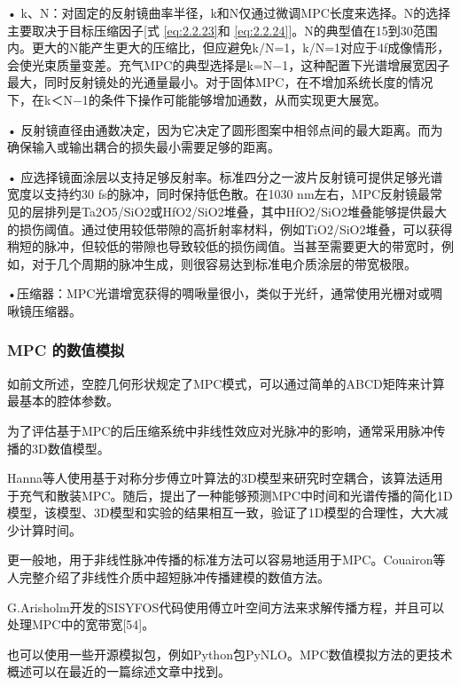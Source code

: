 \documentclass[14pt,a4paper,oneside]{article}
\numberwithin{equation}{subsection}             %
\numberwithin{figure}{subsection}               %
\begin{document}
• k、N：对固定的反射镜曲率半径，k和N仅通过微调MPC长度来选择。N的选择主要取决于目标压缩因子[式 \ref{eq:2.2.23}和 \ref{eq:2.2.24}]。N的典型值在15到30范围内。更大的N能产生更大的压缩比，但应避免k/N=1，k/N=1对应于4f成像情形，会使光束质量变差。充气MPC的典型选择是k=N−1，这种配置下光谱增展宽因子最大，同时反射镜处的光通量最小。对于固体MPC，在不增加系统长度的情况下，在k＜N−1的条件下操作可能能够增加通数，从而实现更大展宽。

• 反射镜直径由通数决定，因为它决定了圆形图案中相邻点间的最大距离。而为确保输入或输出耦合的损失最小需要足够的距离。

• 应选择镜面涂层以支持足够反射率。标准四分之一波片反射镜可提供足够光谱宽度以支持约30 fs的脉冲，同时保持低色散。在1030 nm左右，MPC反射镜最常见的层排列是Ta2O5/SiO2或HfO2/SiO2堆叠，其中HfO2/SiO2堆叠能够提供最大的损伤阈值。通过使用较低带隙的高折射率材料，例如TiO2/SiO2堆叠，可以获得稍短的脉冲，但较低的带隙也导致较低的损伤阈值。当甚至需要更大的带宽时，例如，对于几个周期的脉冲生成，则很容易达到标准电介质涂层的带宽极限。

•压缩器：MPC光谱增宽获得的啁啾量很小，类似于光纤，通常使用光栅对或啁啾镜压缩器。

\subsubsection{MPC 的数值模拟}

如前文所述，空腔几何形状规定了MPC模式，可以通过简单的ABCD矩阵来计算最基本的腔体参数。

为了评估基于MPC的后压缩系统中非线性效应对光脉冲的影响，通常采用脉冲传播的3D数值模型。

Hanna等人使用基于对称分步傅立叶算法的3D模型来研究时空耦合，该算法适用于充气和散装MPC\cite{hannaNonlinearTemporalCompression2017}。随后，提出了一种能够预测MPC中时间和光谱传播的简化1D模型，该模型、3D模型和实验的结果相互一致，验证了1D模型的合理性，大大减少计算时间。\cite{daherMultipassCells1D2020}

更一般地，用于非线性脉冲传播的标准方法可以容易地适用于MPC。Couairon等人完整介绍了非线性介质中超短脉冲传播建模的数值方法\cite{couaironPractitionerGuideLaser}。

G.Arisholm开发的SISYFOS代码使用傅立叶空间方法来求解传播方程，并且可以处理MPC中的宽带宽[54]。

也可以使用一些开源模拟包，例如Python包PyNLO\cite{barbieroEfficientNonlinearCompression2021}。MPC数值模拟方法的更技术概述可以在最近的一篇综述文章中找到\cite{hannaNonlinearOpticsMultipass2021}。
\end{document}

